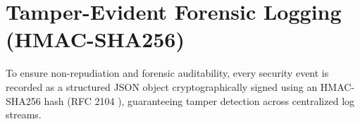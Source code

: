 \section{Tamper-Evident Forensic Logging (HMAC-SHA256)}
To ensure non-repudiation and forensic auditability, every security event is recorded as a structured JSON object cryptographically signed using an HMAC-SHA256 hash (RFC 2104 \cite{rfc2104}), guaranteeing tamper detection across centralized log streams.

